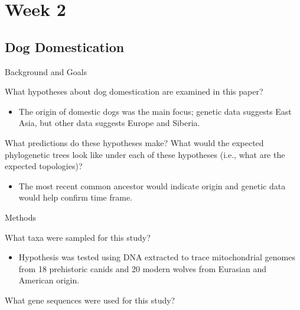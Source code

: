\documentclass[12pt,a4paper]{article}
\begin{document}
\clearpage
\section*{Week 2}
\subsection{Dog Domestication}
\begin{itemize}
    \item Background and Goals
        \begin{itemize}
            {\color{darklc} \item What hypotheses about dog domestication are examined in this paper?}
                \begin{itemize}
                    \item The origin of domestic dogs was the main focus; genetic data suggests East Asia, but other data suggests Europe and Siberia. 
                \end{itemize}
            {\color{darklc} \item  What predictions do these hypotheses make? What would the expected phylogenetic trees look like under each of these hypotheses (i.e., what are the expected topologies)?}
                \begin{itemize}
                    \item The most recent common ancestor would indicate origin and genetic data would help confirm time frame.
                \end{itemize}
        \end{itemize}
    \item Methods
        \begin{itemize}
            {\color{darklc} \item  What taxa were sampled for this study?} 
                \begin{itemize}
                    \item Hypothesis was tested using DNA extracted to trace mitochondrial genomes from 18 prehistoric canids and 20 modern wolves from Eurasian and American origin. 
                \end{itemize}
            {\color{darklc} \item  What gene sequences were used for this study?}

\end{itemize}
\end{itemize}
\end{document}

